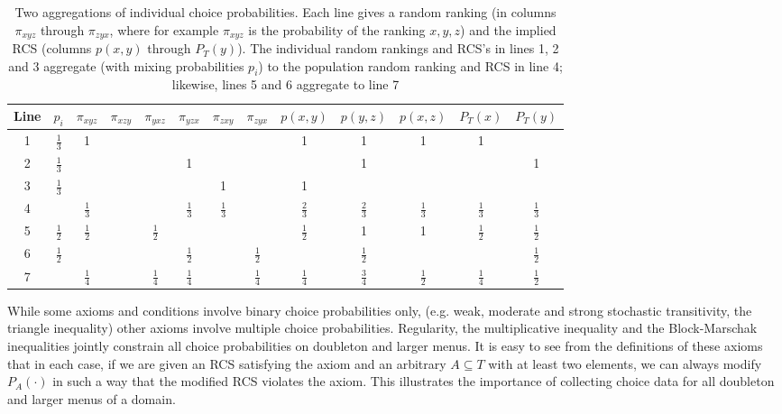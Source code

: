 \documentclass[11pt,letter]{article}
\newcommand{\menus}{menus}
\begin{document}
\begin{table}
	\centering
	\def\arraystretch{1.4}
	\begin{tabular}{cc|cccccc|ccccc}
		Line & $p_i$ & $\pi_{xyz}$ & $\pi_{xzy}$ & $\pi_{yxz}$ & $\pi_{yzx}$ & $\pi_{zxy}$ & $\pi_{zyx}$
		& $p(x,y)$ & $p(y,z)$ & $p(x,z)$ & $P_T(x)$ & $P_T(y)$ \\
		\hline
		1 & $\frac{1}{3}$ & 1 & & & & & & 1 & 1 & 1 & 1 \\
		2 & $\frac{1}{3}$ & & & & 1 & & & & 1 & & & 1 \\
		3 & $\frac{1}{3}$ & & & & & 1 & & 1 \\
		\hline
		4 & & $\frac{1}{3}$ & & & $\frac{1}{3}$ & $\frac{1}{3}$ & & $\frac{2}{3}$ & $\frac{2}{3}$ & $\frac{1}{3}$  & $\frac{1}{3}$  & $\frac{1}{3}$ \\
		\hline
		5 & $\frac{1}{2}$ & $\frac{1}{2}$ & & $\frac{1}{2}$ & & & & $\frac{1}{2}$ & 1 & 1 & $\frac{1}{2}$ & $\frac{1}{2}$ \\
		6 & $\frac{1}{2}$ & & & & $\frac{1}{2}$ & & $\frac{1}{2}$ & & $\frac{1}{2}$ & & & $\frac{1}{2}$ \\
		\hline
		7 & & $\frac{1}{4}$ & & $\frac{1}{4}$ & $\frac{1}{4}$ & & $\frac{1}{4}$ & $\frac{1}{4}$ & $\frac{3}{4}$ & $\frac{1}{2}$ & $\frac{1}{4}$ & $\frac{1}{2}$ \\
		\hline
	\end{tabular}\caption{Two aggregations of individual choice probabilities.
	Each line gives a random ranking (in columns $\pi_{xyz}$ through $\pi_{zyx}$, where for example $\pi_{xyz}$ is the probability of the ranking $x, y, z$) and the implied RCS (columns $p(x,y)$ through $P_T(y)$).
	The individual random rankings and RCS's in lines 1, 2 and 3 aggregate (with mixing probabilities $p_i$) to the population random ranking and RCS in line 4; likewise, lines 5 and 6 aggregate to line 7}\label{t:notconvex}
\end{table}

While some axioms and conditions involve binary choice probabilities only, (e.g. weak, moderate and strong stochastic transitivity, the triangle inequality) other axioms involve multiple choice probabilities.
Regularity, the multiplicative inequality and the Block-Marschak inequalities jointly constrain all choice probabilities on doubleton and larger \menus{}.
It is easy to see from the definitions of these axioms that in each case, if we are given an RCS satisfying the axiom and an arbitrary $A \subseteq T$ with at least two elements, we can always modify $P_A(\cdot)$ in such a way that the modified RCS violates the axiom.
This illustrates the importance of collecting choice data for all doubleton and larger menus of a domain.
\end{document}
